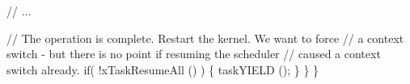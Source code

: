 \begin{DoxyPre}     // ...\end{DoxyPre}



\begin{DoxyPre}     // The operation is complete.  Restart the kernel.  We want to force
     // a context switch - but there is no point if resuming the scheduler
     // caused a context switch already.
     if( !xTaskResumeAll () )
     \{
          taskYIELD ();
     \}
    \}
\}
  \end{DoxyPre}
 